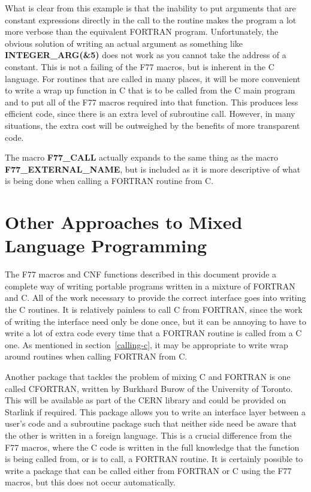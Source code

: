 What is clear from this example is that the inability to put arguments that are
constant expressions directly in the call to the routine makes the program a
lot more verbose than the equivalent FORTRAN program. Unfortunately, the
obvious solution of writing an actual argument as something like {\bf
INTEGER\_ARG(\&5)} does not work as you cannot take the address of a constant.
This is not a failing of the F77 macros, but is inherent in the C language. For
routines that are called in many places, it will be more convenient to write a
wrap up function in C that is to be called from the C main program and to put
all of the F77 macros required into that function. This produces less efficient
code, since there is an extra level of subroutine call. However, in many
situations, the extra cost will be outweighed by the benefits of more
transparent code.

The macro {\bf F77\_CALL} actually expands to the same thing as the macro {\bf
F77\_\-EXTERNAL\_\-NAME}, but is included as it is more descriptive of what is
being done when calling a FORTRAN routine from C.

\section{Other Approaches to Mixed Language Programming}

The F77 macros and CNF functions described in this document provide a
complete way of writing portable programs written in a mixture of FORTRAN and
C. All of the work necessary to provide the correct interface goes into writing
the C routines. It is relatively painless to call C from FORTRAN, since the
work of writing the interface need only be done once, but it can be annoying to
have to write a lot of extra code every time that a FORTRAN routine is called
from a C one. As mentioned in section~\ref{calling-c}, it may be appropriate to
write wrap around routines when calling FORTRAN from C.

Another package that tackles the problem of mixing C and FORTRAN is one called
CFORTRAN, written by Burkhard Burow of the University of Toronto. This will be
available as part of the CERN library and could be provided on Starlink if
required. This package allows you to write an interface layer between a user's
code and a subroutine package such that neither side need be aware that the
other is written in a foreign language. This is a crucial difference from the
F77 macros, where the C code is written in the full knowledge that the function
is being called from, or is to call, a FORTRAN routine. It is certainly
possible to write a package that can be called either from FORTRAN or C using
the F77 macros, but this does not occur automatically.

